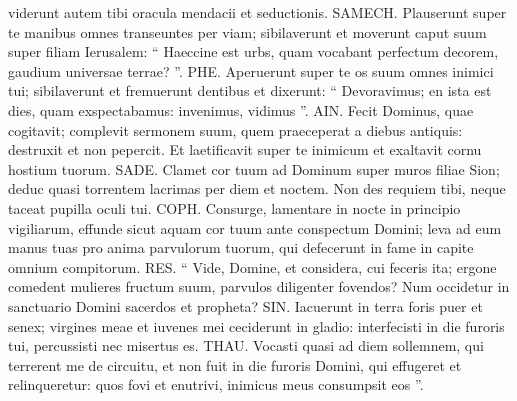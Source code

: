 \begin{biblechapter}
\begin{biblechapter}
 viderunt autem tibi oracula
 mendacii et seductionis.
 \verse SAMECH. Plauserunt super te manibus
 omnes transeuntes per viam;
 sibilaverunt et moverunt caput suum
 super filiam Ierusalem:
 “ Haeccine est urbs, quam vocabant perfectum decorem,
 gaudium universae terrae? ”.
 \verse PHE. Aperuerunt super te os suum
 omnes inimici tui;
 sibilaverunt et fremuerunt dentibus
 et dixerunt: “ Devoravimus;
 en ista est dies, quam exspectabamus:
 invenimus, vidimus ”.
 \verse AIN. Fecit Dominus, quae cogitavit;
 complevit sermonem suum,
 quem praeceperat a diebus antiquis:
 destruxit et non pepercit.
 Et laetificavit super te inimicum
 et exaltavit cornu hostium tuorum.
 \verse SADE. Clamet cor tuum ad Dominum
 super muros filiae Sion;
 deduc quasi torrentem lacrimas
 per diem et noctem.
 Non des requiem tibi,
 neque taceat pupilla oculi tui.
 \verse COPH. Consurge, lamentare in nocte
 in principio vigiliarum,
 effunde sicut aquam cor tuum
 ante conspectum Domini;
 leva ad eum manus tuas
 pro anima parvulorum tuorum,
 qui defecerunt in fame
 in capite omnium compitorum.
 \verse RES. “ Vide, Domine, et considera,
 cui feceris ita;
 ergone comedent mulieres fructum suum,
 parvulos diligenter fovendos?
 Num occidetur in sanctuario Domini
 sacerdos et propheta?
 \verse SIN. Iacuerunt in terra foris
 puer et senex;
 virgines meae et iuvenes mei
 ceciderunt in gladio:
 interfecisti in die furoris tui,
 percussisti nec misertus es.
 \verse THAU. Vocasti quasi ad diem sollemnem,
 qui terrerent me de circuitu,
 et non fuit in die furoris Domini,
 qui effugeret et relinqueretur:
 quos fovi et enutrivi,
 inimicus meus consumpsit eos ”.
 

\end{biblechapter}
\end{biblechapter}
